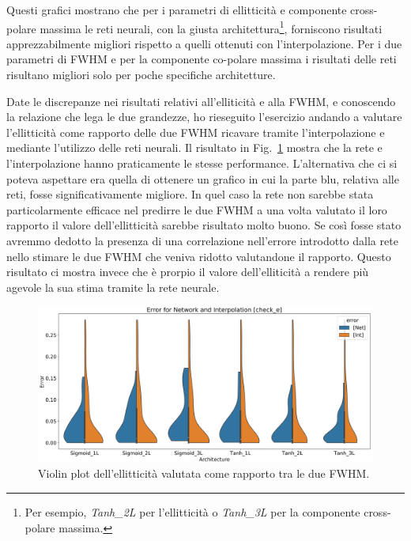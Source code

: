 \documentclass[12pt,a4paper,final]{book}
\begin{document}
Questi grafici mostrano che per i parametri di ellitticità e componente cross-polare massima le reti neurali, con la giusta architettura\footnote{Per esempio, \textit{Tanh\_2L} per l'ellitticità o \textit{Tanh\_3L} per la componente cross-polare massima.}, forniscono risultati apprezzabilmente migliori rispetto a quelli ottenuti con l'interpolazione.
Per i due parametri di FWHM e per la componente co-polare massima i risultati delle reti risultano migliori solo per poche specifiche architetture.


Date le discrepanze nei risultati relativi all'elliticità e alla FWHM, e conoscendo la relazione che lega le due grandezze, ho rieseguito l'esercizio andando a valutare l'ellitticità come rapporto delle due FWHM ricavare tramite l'interpolazione e mediante l'utilizzo delle reti neurali. Il risultato in Fig.~\ref{violin_check} mostra che la rete e l'interpolazione hanno praticamente le stesse performance.
L'alternativa che ci si poteva aspettare era quella di ottenere un grafico in cui la parte blu, relativa alle reti, fosse significativamente migliore. In quel caso la rete non sarebbe stata particolarmente efficace nel predirre le due FWHM a una volta valutato il loro rapporto il valore dell'ellitticità sarebbe risultato molto buono. Se così fosse stato avremmo dedotto la presenza di una correlazione nell'errore introdotto dalla rete nello stimare le due FWHM che veniva ridotto valutandone il rapporto.
Questo risultato ci mostra invece che è prorpio il valore dell'elliticità a rendere più agevole la sua stima tramite la rete neurale.

\begin{figure}[!ht]
	\centering
    \includegraphics[width=\linewidth]{../figures/violin_plot_check_e.png}
    \caption{Violin plot dell'ellitticità valutata come rapporto tra le due FWHM.}
    \label{violin_check}
\end{figure}

\end{document}
